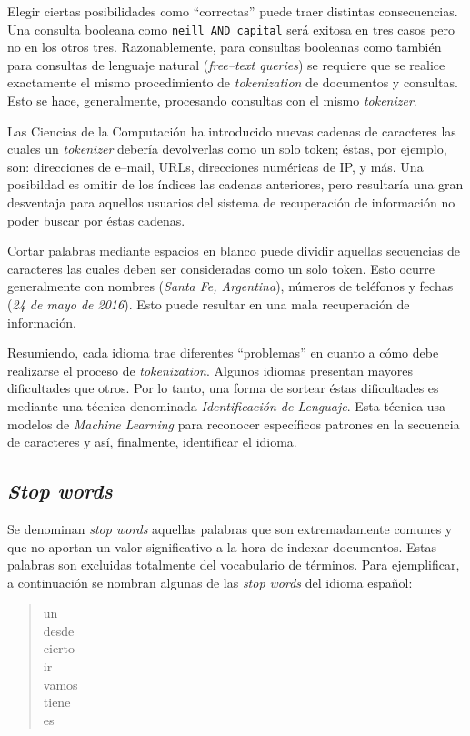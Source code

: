 		Elegir ciertas posibilidades como \enquote{correctas} puede traer distintas consecuencias. Una consulta booleana como \texttt{neill AND capital} será exitosa en tres casos pero no en los otros tres. Razonablemente, para consultas booleanas como también para consultas de lenguaje natural (\textit{free--text queries}) se requiere que se realice exactamente el mismo procedimiento de \textit{tokenization} de documentos y consultas. Esto se hace, generalmente, procesando consultas con el mismo \textit{tokenizer}. \par
		
		Las Ciencias de la Computación ha introducido nuevas cadenas de caracteres las cuales un \textit{tokenizer} debería devolverlas como un solo token; éstas, por ejemplo, son: direcciones de e--mail, URLs, direcciones numéricas de IP, y más. Una posibildad es omitir de los índices las cadenas anteriores, pero resultaría una gran desventaja para aquellos usuarios del sistema de recuperación de información no poder buscar por éstas cadenas. \par
		
		Cortar palabras mediante espacios en blanco puede dividir aquellas secuencias de caracteres las cuales deben ser consideradas como un solo token. Esto ocurre generalmente con nombres (\textit{Santa Fe, Argentina}), números de teléfonos y fechas (\textit{24 de mayo de 2016}). Esto puede resultar en una mala recuperación de información. \par
		
		Resumiendo, cada idioma trae diferentes \enquote{problemas} en cuanto a cómo debe realizarse el proceso de \textit{tokenization}. Algunos idiomas presentan mayores dificultades que otros. Por lo tanto, una forma de sortear éstas dificultades es mediante una técnica denominada \textit{Identificación de Lenguaje}. Esta técnica usa modelos de \textit{Machine Learning} para reconocer específicos patrones en la secuencia de caracteres y así, finalmente, identificar el idioma.
		
	\subsection{\textit{Stop words}}
		Se denominan \textit{stop words} aquellas palabras que son extremadamente comunes y que no aportan un valor significativo a la hora de indexar documentos. Estas palabras son excluidas totalmente del vocabulario de términos. Para ejemplificar, a continuación se nombran algunas de las \textit{stop words} del idioma español:
		\begin{quote}
			\begin{ttfamily}
				un \\
				desde \\
				cierto \\
				ir \\
				vamos \\
				tiene \\
				es				
			\end{ttfamily}
		\end{quote}
		
